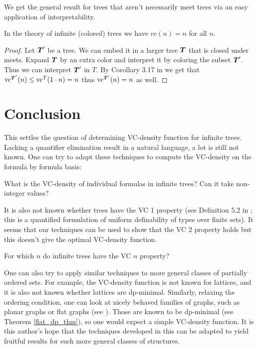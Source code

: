 We get the general result for trees that aren't necessarily meet trees via an easy application of interpretability.
\begin{Corollary}
  In the theory of infinite (colored) trees we have $vc(n) = n$ for all $n$.
\end{Corollary}
\begin{proof}
  Let $\operatorname{\boldsymbol T}'$ be a tree. We can embed it in a larger tree $\operatorname{\boldsymbol T}$ that is closed under meets. Expand $\operatorname{\boldsymbol T}$ by an extra color and interpret it by coloring the subset $\operatorname{\boldsymbol T}'$. Thus we can interpret $\operatorname{\boldsymbol T}'$ in $T$. By Corollary 3.17 in \cite{density} we get that $\operatorname{vc}^{\operatorname{\boldsymbol T}'}(n) \leq \operatorname{vc}^T(1 \cdot n) = n$ thus $\operatorname{vc}^{\operatorname{\boldsymbol T}'}(n) = n$ as well.
\end{proof}

\section{Conclusion}
This settles the question of determining VC-density function for infinite trees.
Lacking a quantifier elimination result in a natural language, a lot is still not known.
One can try to adapt these techniques to compute the VC-density on the formula by formula basis:
\begin{openq}
  What is the VC-density of individual formulas in infinite trees?
  Can it take non-integer values?
\end{openq}
It is also not known whether trees have the VC 1 property
(see Definition 5.2 in \cite{density}; this is a quantified formulation of uniform definability of types over finite sets).
It seems that our techniques can be used to show that the VC 2 property holds but this doesn't give the optimal VC-density function.
\begin{openq}
  For which $n$ do infinite trees have the VC $n$ property?
\end{openq}
One can also try to apply similar techniques to more general classes of partially ordered sets.
For example, the VC-density function is not known for lattices, and it is also not known whether lattices are dp-minimal.
Similarly, relaxing the ordering condition,
one can look at nicely behaved families of graphs, such as planar graphs or flat graphs (see \cite{stable_graphs}).
Those are known to be dp-minimal (see Theorem \ref{flat_dp_thm}), so one would expect a simple VC-density function.
It is this author's hope that the techniques developed in this \chapa can be adapted
to yield fruitful results for such more general classes of structures.